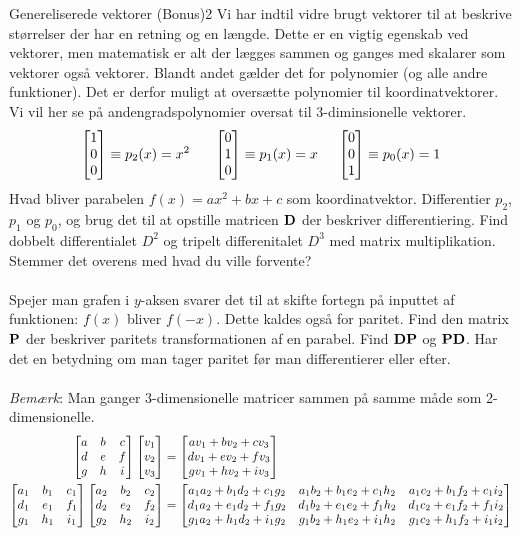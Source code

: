 \begin{opgave}{Genereliserede vektorer (Bonus)}{2}
Vi har indtil vidre brugt vektorer til at beskrive størrelser der har en retning og en længde. Dette er en vigtig egenskab ved vektorer, men matematisk er alt der lægges sammen og ganges med skalarer som vektorer også vektorer. Blandt andet gælder det for polynomier (og alle andre funktioner). Det er derfor muligt at oversætte polynomier til koordinatvektorer. Vi vil her se på andengradspolynomier oversat til 3-diminsionelle vektorer.
\begin{equation}
\begin{bmatrix} 1 \\ 0 \\ 0 \end{bmatrix} \equiv p_2(x)=x^2~~~~~\begin{bmatrix} 0 \\ 1 \\ 0 \end{bmatrix} \equiv p_1(x) = x ~~~~\begin{bmatrix} 0 \\ 0 \\ 1 \end{bmatrix} \equiv  p_0(x)=1
\end{equation}
\opg Hvad bliver parabelen $f(x) = ax^2+bx+c$ som koordinatvektor.
\opg Differentier $p_2$, $p_1$ og $p_0$, og brug det til at opstille matricen $\mathbf{D}$ der beskriver differentiering.
\opg Find dobbelt differentialet $D^2$ og tripelt differenitalet $D^3$ med matrix multiplikation. Stemmer det overens med hvad du ville forvente?
\\\\Spejer man grafen i $y$-aksen svarer det til at skifte fortegn på inputtet af funktionen: $f(x)$ bliver $f(-x)$. Dette kaldes også for paritet.
\opg Find den matrix $\mathbf{P}$ der beskriver paritets transformationen af en parabel.
\opg Find $\mathbf{D}\mathbf{P}$ og $\mathbf{P} \mathbf{D}$. Har det en betydning om man tager paritet før man differentierer eller efter.
\\\\
\emph{Bemærk}: Man ganger 3-dimensionelle matricer sammen på samme måde som 2-dimensionelle.
\begin{align}
\begin{bmatrix}
a&b&c\\
d&e&f\\
g&h&i
\end{bmatrix}
\begin{bmatrix} v_1 \\ v_2 \\ v_3 \end{bmatrix} &= \begin{bmatrix} av_1+bv_2+cv_3 \\ dv_1+ev_2+fv_3 \\ gv_1+hv_2+iv_3 \end{bmatrix}\\
\begin{bmatrix}
a_1&b_1&c_1\\
d_1&e_1&f_1\\
g_1&h_1&i_1
\end{bmatrix}
\begin{bmatrix}
a_2&b_2&c_2\\
d_2&e_2&f_2\\
g_2&h_2&i_2
\end{bmatrix}
&=\begin{bmatrix}
a_1a_2+b_1d_2+c_1g_2&a_1b_2+b_1e_2+c_1h_2&a_1c_2+b_1f_2+c_1i_2\\
d_1a_2+e_1d_2+f_1g_2&d_1b_2+e_1e_2+f_1h_2&d_1c_2+e_1f_2+f_1i_2\\
g_1a_2+h_1d_2+i_1g_2&g_1b_2+h_1e_2+i_1h_2&g_1c_2+h_1f_2+i_1i_2
\end{bmatrix}
\end{align}
\end{opgave}

